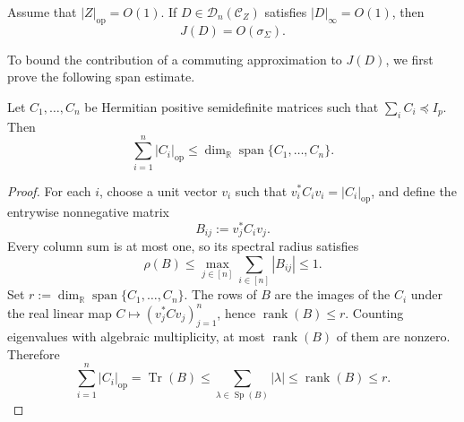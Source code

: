 \documentclass[EJP, preprint, NODS, nobera, nofontexpansion]{ejpecp}
\DeclareMathOperator{\op}{op}
\DeclareMathOperator{\tr}{Tr}
\begin{document}
\begin{lemma}
\label{lem:sigma_profile_interaction}
Assume that $|Z|_{\op}=O(1)$. If $D\in\mathcal D_n(\mathcal C_Z)$
satisfies $|D|_\infty=O(1)$, then
\[
    J(D)=O(\sigma_\Sigma).
\]
\end{lemma}

To bound the contribution of a commuting approximation to $J(D)$,
we first prove the following span estimate.

\begin{lemma}
\label{lem:positive_profile_span_bound}
Let $C_1,\ldots,C_n$ be Hermitian positive semidefinite matrices such that
$\sum_iC_i\preceq I_p$.  Then
\[
    \sum_{i=1}^n|C_i|_{\op}
    \leq
    \dim_{\mathbb R}\operatorname{span}\{C_1,\ldots,C_n\}.
\]
\end{lemma}

\begin{proof}
For each $i$, choose a unit vector $v_i$ such that
$v_i^*C_iv_i=|C_i|_{\op}$, and define the entrywise nonnegative matrix
\[
    B_{ij}:=v_j^*C_iv_j.
\]
Every column sum is at most one, so its spectral radius satisfies
\[
    \rho(B)\leq\max_{j\in[n]}\sum_{i\in[n]}|B_{ij}|\leq1.
\]
Set $r:=\dim_{\mathbb R}\operatorname{span}\{C_1,\ldots,C_n\}$. 
The rows of $B$ are the images of the $C_i$ under the real linear map
$C\mapsto(v_j^*Cv_j)_{j=1}^n$, hence $\operatorname{rank}(B)\leq r$.
Counting eigenvalues with algebraic multiplicity, at most
$\operatorname{rank}(B)$ of them are nonzero.  Therefore
\[
    \sum_{i=1}^n|C_i|_{\op}
    =\tr(B)
    \leq\sum_{\lambda\in\operatorname{Sp}(B)}|\lambda|
    \leq\operatorname{rank}(B)
    \leq r.
\]
\end{proof}
\end{document}
